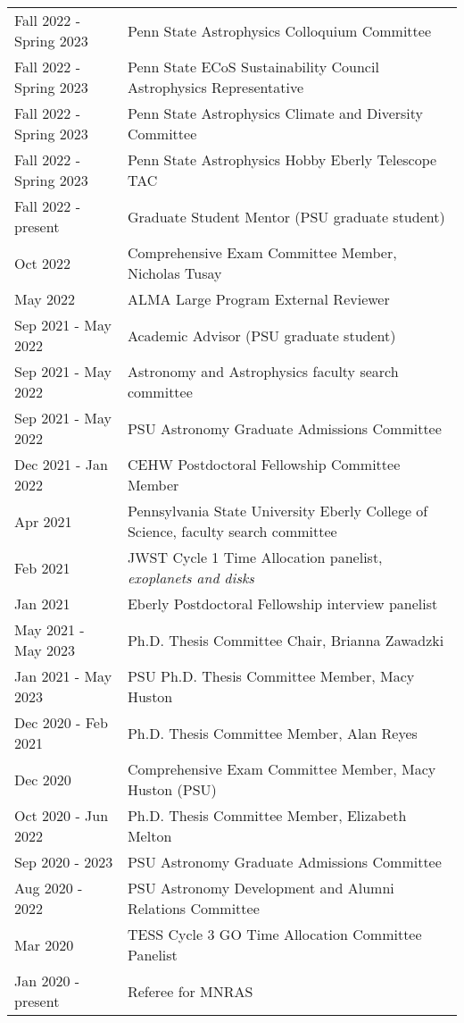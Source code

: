 \begin{tabular*}{\textwidth}{@{\hspace{10pt}}p{1.4in}l}
Fall 2022 - Spring 2023 & Penn State Astrophysics Colloquium Committee \\
Fall 2022 - Spring 2023 & Penn State ECoS Sustainability Council Astrophysics Representative \\
Fall 2022 - Spring 2023 & Penn State Astrophysics Climate and Diversity Committee \\
Fall 2022 - Spring 2023 & Penn State Astrophysics Hobby Eberly Telescope TAC \\
Fall 2022 - present & Graduate Student Mentor (PSU graduate student) \\ %
Oct 2022 & Comprehensive Exam Committee Member, Nicholas Tusay \\
May 2022 & ALMA Large Program External Reviewer \\
Sep 2021 - May 2022 & Academic Advisor (PSU graduate student) \\ %
Sep 2021 - May 2022 & Astronomy and Astrophysics faculty search committee\\
Sep 2021 - May 2022 & PSU Astronomy Graduate Admissions Committee \\ 
Dec 2021 - Jan 2022 & CEHW Postdoctoral Fellowship Committee Member \\
Apr 2021 & Pennsylvania State University Eberly College of Science, faculty search committee\\
Feb 2021 & JWST Cycle 1 Time Allocation panelist, \emph{exoplanets and disks}\\
Jan 2021 & Eberly Postdoctoral Fellowship interview panelist\\
May 2021 - May 2023 & Ph.D. Thesis Committee Chair, Brianna Zawadzki\\
Jan 2021 - May 2023 & PSU Ph.D. Thesis Committee Member, Macy Huston\\
Dec 2020 - Feb 2021 & Ph.D. Thesis Committee Member, Alan Reyes\\
Dec 2020 & Comprehensive Exam Committee Member, Macy Huston (PSU)\\
Oct 2020 - Jun 2022 & Ph.D. Thesis Committee Member, Elizabeth Melton\\
Sep 2020 - 2023 & PSU Astronomy Graduate Admissions Committee \\ 
Aug 2020 - 2022 & PSU Astronomy Development and Alumni Relations Committee \\
Mar 2020 & TESS Cycle 3 GO Time Allocation Committee Panelist \\
Jan 2020 - present & Referee for MNRAS \\ 

\end{tabular*}
